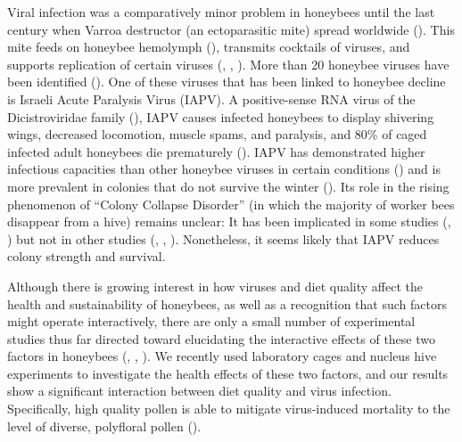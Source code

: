\documentclass[11pt,a4paper,oldfontcommands,openany]{memoir}
\numberwithin{equation}{section} %
\begin{document}
Viral infection was a comparatively minor problem in honeybees until the last century when Varroa destructor (an ectoparasitic mite) spread worldwide (\citealt{miteSpread}). This mite feeds on honeybee hemolymph (\citealt{hemolymph}), transmits cocktails of viruses, and supports replication of certain viruses (\citealt{miteVirus}, \citealt{miteVirus2}, \citealt{miteVirus3}). More than 20 honeybee viruses have been identified (\citealt{numVirus}). One of these viruses that has been linked to honeybee decline is Israeli Acute Paralysis Virus (IAPV). A positive-sense RNA virus of the Dicistroviridae family (\citealt{fam}), IAPV causes infected honeybees to display shivering wings, decreased locomotion, muscle spams, and paralysis, and 80\% of caged infected adult honeybees die prematurely (\citealt{symptoms}). IAPV has demonstrated higher infectious capacities than other honeybee viruses in certain conditions (\citealt{carrillo}) and is more prevalent in colonies that do not survive the winter (\citealt{winter}). Its role in the rising phenomenon of ``Colony Collapse Disorder'' (in which the majority of worker bees disappear from a hive) remains unclear: It has been implicated in some studies (\citealt{iapvCCD}, \citealt{iapvCCD2}) but not in other studies (\citealt{ccd1}, \citealt{iapvCCD3}, \citealt{fam}). Nonetheless, it seems likely that IAPV reduces colony strength and survival.

Although there is growing interest in how viruses and diet quality affect the health and sustainability of honeybees, as well as a recognition that such factors might operate interactively, there are only a small number of experimental studies thus far directed toward elucidating the interactive effects of these two factors in honeybees (\citealt{intNV}, \citealt{intNV2}, \citealt{intNV3}). We recently used laboratory cages and nucleus hive experiments to investigate the health effects of these two factors, and our results show a significant interaction between diet quality and virus infection. Specifically, high quality pollen is able to mitigate virus-induced mortality to the level of diverse, polyfloral pollen (\citealt{adamInt}). 
\end{document}
